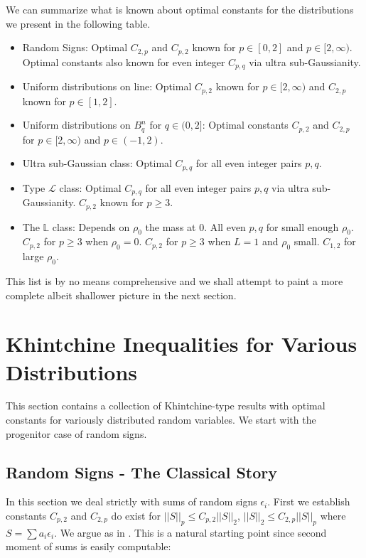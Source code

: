 \documentclass[10pt]{article}
\newcommand{\1}{\textbf{1}}
\theoremstyle{remark}
\theoremstyle{definition}
\begin{document}
We can summarize what is known about optimal constants for the distributions  we present in the following table.

\begin{itemize}
	\item Random Signs: Optimal $C_{2,p}$ and $C_{p,2}$ known for $p \in [0,2]$ and $p \in [2,\infty)$. Optimal constants also known for even integer $C_{p,q}$ via ultra sub-Gaussianity.
	\item Uniform distributions on line: Optimal $C_{p,2}$ known for $p \in [2,\infty)$ and $C_{2,p}$ known for $p \in [1,2]$.
	\item Uniform distributions on $B_q^n$ for $q \in (0,2]$: Optimal constants $C_{p,2}$ and $C_{2,p}$ for $p \in [2,\infty)$ and $p \in (-1,2)$. 
	\item Ultra sub-Gaussian class: Optimal $C_{p,q}$ for all even integer pairs $p,q$. 
	\item Type $\mathcal{L}$ class: Optimal $C_{p,q}$ for all even integer pairs $p,q$ via ultra sub-Gaussianity. $C_{p,2}$ known for $p \geq 3$. 
	\item The $\mathbb{L}$ class: Depends on $\rho_0$ the mass at 0. All even $p,q$ for small enough $\rho_0$. $C_{p,2}$ for $p \geq 3$ when $\rho_0 = 0$. $C_{p,2}$ for $p \geq 3$ when $L=1$ and $\rho_0$ small. $C_{1,2}$ for large $\rho_0$.
\end{itemize}

This list is by no means comprehensive and we shall attempt to paint a more complete albeit shallower picture in the next section.

\newpage

\section{Khintchine Inequalities for Various Distributions}

This section contains a collection of Khintchine-type results with optimal constants for variously distributed random variables. We start with the progenitor case of random signs.

\subsection{Random Signs - The Classical Story}

In this section we deal strictly with sums of random signs $\epsilon_i$. First we establish constants $C_{p,2}$ and $C_{2,p}$ do exist for $||S||_p \leq C_{p,2} ||S||_2$, $ ||S||_2 \leq C_{2,p}||S||_p$ where $S = \sum a_i \epsilon_i$. We argue as in \cite{LT}. This is a natural starting point since second moment of sums is easily computable:
\end{document}
